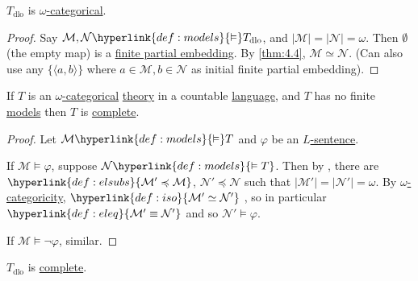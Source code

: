 \documentclass{article}
\let\models\vDash
\begin{document}
\begin{ncor}\label{cor:4.7}
  \hyperlink{def:tlo}{$T_{\text{dlo}}$} is \hyperlink{def:wcat}{$\omega$-categorical}.
\end{ncor}
\begin{proof}
  Say $\mathcal{M},\mathcal{N} \hyperlink{def:models}{\models} T_{\text{dlo}}$, and $|\mathcal{M}| = |\mathcal{N}| = \omega$.
  Then $\emptyset$ (the empty map) is a \hyperlink{def:pe}{finite partial embedding}.
  By \cref{thm:4.4}, $\mathcal{M} \simeq \mathcal{N}$.
  (Can also use any $\{\langle a, b \rangle\}$ where $a \in \mathcal{M}, b \in \mathcal{N}$ as initial finite partial embedding).
\end{proof}
\begin{nthm}\label{thm:4.8}
  If $T$ is an \hyperlink{def:wcat}{$\omega$-categorical} \hyperlink{def:ltheory}{theory} in a countable \hyperlink{def:lang}{language}, and $T$ has no finite \hyperlink{def:model}{models} then $T$ is \hyperlink{def:complete}{complete}.
\end{nthm}
\begin{proof}
  Let $\mathcal{M} \hyperlink{def:models}{\models} T$ and $\varphi$ be an \hyperlink{def:sentence}{$L$-sentence}.

  If $\mathcal{M} \models \varphi$, suppose $\mathcal{N} \hyperlink{def:models}{\models T}$.
  Then by , there are $\hyperlink{def:elsubs}{\mathcal{M}' \preccurlyeq \mathcal{M}}$, $\mathcal{N}' \preccurlyeq \mathcal{N}$ such that $|\mathcal{M}'| = |\mathcal{N}'| = \omega$.
  By \hyperlink{def:wcat}{$\omega$-categoricity}, $\hyperlink{def:iso}{\mathcal{M}' \simeq \mathcal{N}'}$ , so in particular $\hyperlink{def:eleq}{\mathcal{M}' \equiv \mathcal{N}'}$ and so $\mathcal{N}' \models \varphi$.

  If $\mathcal{M} \models \lnot \varphi$, similar.
\end{proof}
\begin{ncor}\label{cor:4.9}
  \hyperlink{def:tlo}{$T_{\text{dlo}}$} is \hyperlink{def:complete}{complete}.
\end{ncor}
\end{document}
